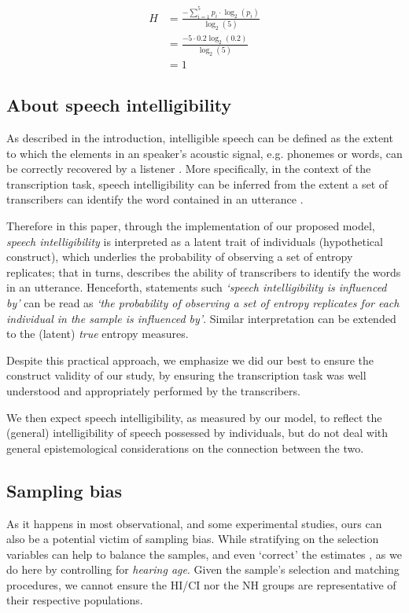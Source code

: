 %
\begin{align*}
	H &= \frac{-\sum_{i=1}^{5} p_{i} \cdot \log_{2}(p_{i})}{\log_{2}(5)} \\
	&= \frac{- 5 \cdot 0.2 \log_{2}(0.2) }{\log_{2}(5)} \\
	&= 1
\end{align*} 
%
%
\subsection{About speech intelligibility} \label{sSA:SI}
%
As described in the introduction, intelligible speech can be defined as the extent to which the elements in an speaker's acoustic signal, e.g. phonemes or words, can be correctly recovered by a listener \citep{Kent_et_al_1989, Whitehill_et_al_2004, vanHeuven_2008, Freeman_et_al_2017}. More specifically, in the context of the transcription task, speech intelligibility can be inferred from the extent a set of transcribers can identify the word contained in an utterance \cite{Boonen_et_al_2021}.

Therefore in this paper, through the implementation of our proposed model, \textit{speech intelligibility} is interpreted as a latent trait of individuals (hypothetical construct), which underlies the probability of observing a set of entropy replicates; that in turns, describes the ability of transcribers to identify the words in an utterance. Henceforth, statements such \textit{`speech intelligibility is influenced by'} can be read as \textit{`the probability of observing a set of entropy replicates for each individual in the sample is influenced by'}. Similar interpretation can be extended to the (latent) \textit{true} entropy measures. 

Despite this practical approach, we emphasize we did our best to ensure the construct validity of our study, by ensuring the transcription task was well understood and appropriately performed by the transcribers.

We then expect speech intelligibility, as measured by our model, to reflect the (general) intelligibility of speech possessed by individuals, but do not deal with general epistemological considerations on the connection between the two.
%
%
\subsection{Sampling bias} \label{sSA:sampling_bias}
%
As it happens in most observational, and some experimental studies, ours can also be a potential victim of sampling bias. While stratifying on the selection variables can help to balance the samples, and even `correct' the estimates \cite{Cinelli_et_al_2021, Deffner_et_al_2022}, as we do here by controlling for \textit{hearing age}. Given the sample's selection and matching procedures, we cannot ensure the HI/CI nor the NH groups are representative of their respective populations. 

